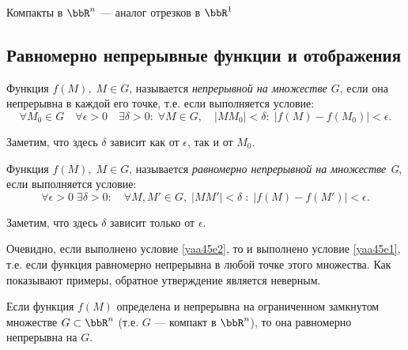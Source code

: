 Компакты в $\bbR^n$ --- аналог отрезков в $\bbR^1$



\subsection{Равномерно непрерывные функции и отображения}

\begin{defn}
Функция $f(M),\;M\in G$, называется \textit{непрерывной на множестве $G$}, если она непрерывна в каждой его точке, т.е. если выполняется условие:
\begin{equation}\label{yaa45e1}
\forall M_0\in G\quad \forall\epsilon>0 \quad \exists\delta>0:\;\forall M\in G,\quad |MM_0|<\delta:\;|f(M)-f(M_0)|<\epsilon.
\end{equation}
\end{defn}
Заметим, что здесь $\delta$ зависит как от $\epsilon$, так и от $M_0$.

\begin{defn}
Функция $f(M),\; M\in G$, называется \textit{равномерно непрерывной на множестве G}, если выполняется условие:
\begin{equation}\label{yaa45e2}
\forall\epsilon>0\;\exists\delta>0:\quad\forall M, M'\in G,\; |MM'|<\delta\; :\; |f(M)-f(M')|<\epsilon.
\end{equation}
\end{defn}
Заметим, что здесь $\delta$ зависит только от $\epsilon$.

Очевидно, если выполнено условие \eqref{yaa45e2}, то и выполнено условие \eqref{yaa45e1}, т.е. если функция равномерно непрерывна в любой точке этого множества. Как показывают примеры, обратное утверждение является неверным.

\begin{thm}
Если функция $f(M)$ определена и непрерывна на ограниченном замкнутом множестве $G\subset\bbR^n$ (т.е. $G$ --- компакт в $\bbR^n$), то она равномерно непрерывна на $G$.
\end{thm}

